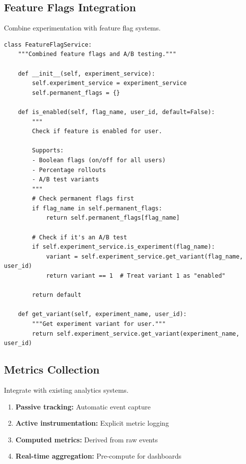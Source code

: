 \subsection{Feature Flags Integration}

Combine experimentation with feature flag systems.

\lstset{language=Python, caption=Feature Flag with A/B Testing}
\begin{lstlisting}
class FeatureFlagService:
    """Combined feature flags and A/B testing."""

    def __init__(self, experiment_service):
        self.experiment_service = experiment_service
        self.permanent_flags = {}

    def is_enabled(self, flag_name, user_id, default=False):
        """
        Check if feature is enabled for user.

        Supports:
        - Boolean flags (on/off for all users)
        - Percentage rollouts
        - A/B test variants
        """
        # Check permanent flags first
        if flag_name in self.permanent_flags:
            return self.permanent_flags[flag_name]

        # Check if it's an A/B test
        if self.experiment_service.is_experiment(flag_name):
            variant = self.experiment_service.get_variant(flag_name, user_id)
            return variant == 1  # Treat variant 1 as "enabled"

        return default

    def get_variant(self, experiment_name, user_id):
        """Get experiment variant for user."""
        return self.experiment_service.get_variant(experiment_name, user_id)
\end{lstlisting}

\subsection{Metrics Collection}

Integrate with existing analytics systems.

\begin{enumerate}
    \item \textbf{Passive tracking:} Automatic event capture

    \item \textbf{Active instrumentation:} Explicit metric logging

    \item \textbf{Computed metrics:} Derived from raw events

    \item \textbf{Real-time aggregation:} Pre-compute for dashboards
\end{enumerate}

